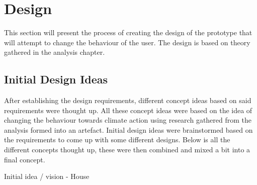 \chapter{Design}
This section will present the process of creating the design of the prototype that will attempt to change the behaviour of the user. The design is based on theory gathered in the analysis chapter. 

\section{Initial Design Ideas}
After establishing the design requirements, different concept ideas based on said requirements were thought up. All these concept ideas were based on the idea of changing the behaviour towards climate action using research gathered from the analysis formed into an artefact. Initial design ideas were brainstormed based on the requirements to come up with some different designs. Below is all the different concepts thought up, these were then combined and mixed a bit into a final concept.

Initial idea / vision - House

